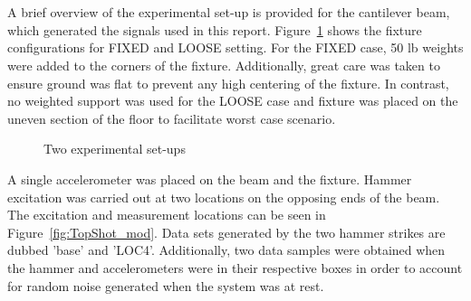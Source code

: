 \documentclass[paper=a4, fontsize=12pt]{scrartcl} %
\begin{document}
\\
\\
A brief overview of the experimental set-up is provided for the cantilever beam, which generated the signals used in this report. Figure~\ref{fig:ExperimentSetup} shows the fixture configurations for FIXED and LOOSE setting. For the FIXED case, 50 lb weights were added to the corners of the fixture. Additionally, great care was taken to ensure ground was flat to prevent any high centering of the fixture.  In contrast, no weighted support was used for the LOOSE case and fixture was placed on the uneven section of the floor to facilitate worst case scenario.
%
	\begin{figure}[H]
		\centering
		\quad
		\caption{Two experimental set-ups}
		\label{fig:ExperimentSetup}
	\end{figure}
%
A single accelerometer was placed on the beam and the fixture. Hammer excitation was carried out at two locations on the opposing ends of the beam. The excitation and measurement locations can be seen in Figure~\ref{fig:TopShot_mod}. Data sets generated by the two hammer strikes are dubbed 'base' and 'LOC4'. Additionally, two data samples were obtained when the hammer and accelerometers were in their respective boxes in order to account for random noise generated when the system was at rest.
\end{document}

